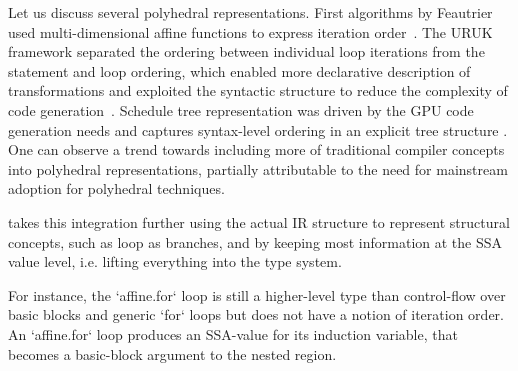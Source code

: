 Let us discuss several polyhedral representations. First algorithms by
Feautrier used multi-dimensional affine functions to express iteration
order~\cite{Fea92b}. The URUK framework separated the ordering between
individual loop iterations from the statement and loop ordering, which enabled
more declarative description of transformations and exploited the syntactic
structure to reduce the complexity of code generation~\cite{urgent}. Schedule
tree representation was driven by the GPU code generation needs
and captures syntax-level ordering in an explicit tree structure
.
One can observe a trend towards including more of traditional compiler concepts
into polyhedral representations, partially attributable to the need for
mainstream adoption for polyhedral techniques.

\MLIR takes this integration further using the actual IR structure to represent
structural concepts, such as loop as branches, and by keeping most information
at the SSA value level, i.e. lifting everything into the type system.

For instance, the `affine.for` loop is still a higher-level type than
control-flow over basic blocks and generic `for` loops but does not have a
notion of iteration order. An `affine.for` loop produces an SSA-value for its
induction variable, that becomes a basic-block argument to the nested region.



%

\fi
